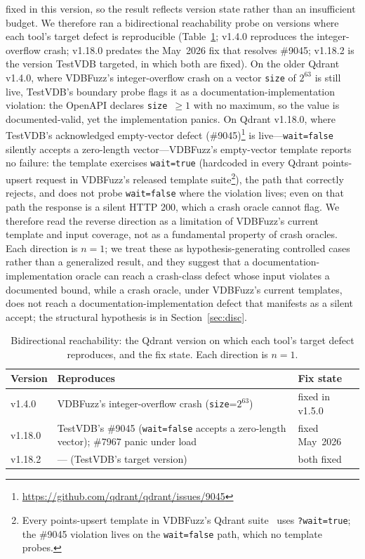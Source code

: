 \documentclass[sigconf]{acmart}
\begin{document}
fixed in this version, so the result reflects version state rather than an insufficient budget. We therefore ran a bidirectional reachability probe on versions where each tool's target defect is reproducible (Table~\ref{tab:versions}; v1.4.0 reproduces the integer-overflow crash; v1.18.0 predates the May~2026 fix that resolves \#9045; v1.18.2 is the version TestVDB targeted, in which both are fixed). On the older Qdrant v1.4.0, where VDBFuzz's integer-overflow crash on a vector \texttt{size} of $2^{63}$ is still live, TestVDB's boundary probe flags it as a documentation-implementation violation: the OpenAPI declares \texttt{size}~$\geq 1$ with no maximum, so the value is documented-valid, yet the implementation panics. On Qdrant v1.18.0, where TestVDB's acknowledged empty-vector defect (\#9045)\footnote{\url{https://github.com/qdrant/qdrant/issues/9045}} is live---\texttt{wait=false} silently accepts a zero-length vector---VDBFuzz's empty-vector template reports no failure: the template exercises \texttt{wait=true} (hardcoded in every Qdrant points-upsert request in VDBFuzz's released template suite\footnote{Every points-upsert template in VDBFuzz's Qdrant suite~\cite{vdbfuzz26} uses \texttt{?wait=true}; the \#9045 violation lives on the \texttt{wait=false} path, which no template probes.}), the path that correctly rejects, and does not probe \texttt{wait=false} where the violation lives; even on that path the response is a silent HTTP 200, which a crash oracle cannot flag. We therefore read the reverse direction as a limitation of VDBFuzz's current template and input coverage, not as a fundamental property of crash oracles. Each direction is $n{=}1$; we treat these as hypothesis-generating controlled cases rather than a generalized result, and they suggest that a documentation-implementation oracle can reach a crash-class defect whose input violates a documented bound, while a crash oracle, under VDBFuzz's current templates, does not reach a documentation-implementation defect that manifests as a silent accept; the structural hypothesis is in Section~\ref{sec:disc}.

\begin{table}[t]
\caption{Bidirectional reachability: the Qdrant version on which each tool's target defect reproduces, and the fix state. Each direction is $n{=}1$.}
\label{tab:versions}
\small
\begin{tabular}{@{}p{}p{}p{}@{}}
\toprule
Version & Reproduces & Fix state \\
\midrule
v1.4.0 & VDBFuzz's integer-overflow crash (\texttt{size}=$2^{63}$) & fixed in v1.5.0 \\
v1.18.0 & TestVDB's \#9045 (\texttt{wait=false} accepts a zero-length vector); \#7967 panic under load & fixed May~2026 \\
v1.18.2 & --- (TestVDB's target version) & both fixed \\
\bottomrule
\end{tabular}
\end{table}
\end{document}
